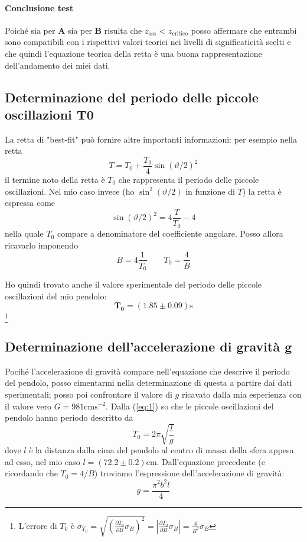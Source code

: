 \documentclass{article}
\begin{document}
	\paragraph{Conclusione test} Poiché sia per $\mathbf{A}$ sia per $\mathbf{B}$ risulta che $z_{\text{oss}}$ < $z_{\text{critico}}$ posso affermare che entrambi sono compatibili con i rispettivi valori teorici nei livelli di significaticità scelti e che quindi l'equazione teorica della retta è una buona rappresentazione dell'andamento dei miei dati.
	
	\subsection{Determinazione del periodo delle piccole oscillazioni T0}
	La retta di "best-fit" può fornire altre importanti informazioni: per esempio nella retta 
	\[
	T = T_0 + \frac{T_0}{4}\sin{\left(\vartheta/2\right)}^2
	\]
	il termine noto della retta è $T_0$ che rappresenta il periodo delle piccole oscillazioni. Nel mio caso invece (ho $\sin^2(\vartheta/2)$ in funzione di $T$) la retta è espressa come
	\[
	\sin{\left(\vartheta/2\right)}^2 = 4\frac{T}{T_0} - 4
	\]
	nella quale $T_0$ compare a denominatore del coefficiente angolare. Posso allora ricavarlo imponendo
	\[
	B =  4\frac{1}{T_0} \qquad T_0 = \frac{4}{B} 
	\]
	
	\noindent
	Ho quindi trovato anche il valore sperimentale del periodo delle piccole oscillazioni del mio pendolo:
	\[
	\mathbf{T_0} = (1.85 \pm 0.09)\text{s}
	\]
	\footnote{L'errore di $T_0$ è $\sigma_{T_0} = \sqrt{\left(\frac{\partial T_0}{\partial B}\sigma_{B}\right)^2} = \left|\frac{\partial T_0}{\partial B}\sigma_{B}\right| = \frac{4}{B^2}\sigma_B$}
	
	\subsection{Determinazione dell'accelerazione di gravità g}
	Pocihé l'accelerazione di gravità compare nell'equazione che descrive il periodo del pendolo, posso cimentarmi nella determinazione di questa a partire dai dati sperimentali; posso poi confrontare il valore di $g$ ricavato dalla mia esperienza con il valore vero $G = 981 \text{cms}^{-2}$. Dalla (\ref{eq:1}) so che le piccole oscillazioni del pendolo hanno periodo descritto da
	\[
	T_0 = 2\pi \sqrt{\frac{l}{g}} 
	\]
	dove $l$ è la distanza dalla cima del pendolo al centro di massa della sfera appesa ad esso, nel mio caso $l = (72.2 \pm 0.2)$cm. Dall'equazione precedente (e ricordando che $T_0 = 4/B$) troviamo l'espressione dell'accelerazione di gravità:
	\[
	g = \frac{\pi^2b^2l}{4}
	\]
	
\end{document}
